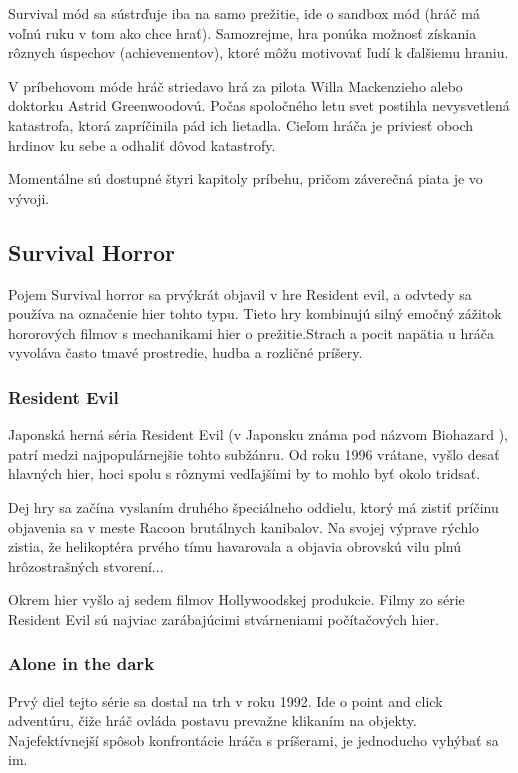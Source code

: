 \documentclass[10pt,oneoside,slovak,a4paper]{article}
\begin{document}
Survival mód sa  sústrďuje iba na samo prežitie, ide o sandbox  mód (hráč má voľnú ruku v tom ako chce hrať).  Samozrejme, hra ponúka  možnosť získania rôznych úspechov (achievementov), ktoré môžu motivovať ľudí k ďalšiemu hraniu. \cite{Virtanen}

V príbehovom móde hráč striedavo hrá za pilota Willa Mackenzieho  alebo doktorku  Astrid Greenwoodovú. Počas spoločného letu svet postihla nevysvetlená katastrofa, ktorá zapríčinila pád ich lietadla. Cieľom hráča je priviesť oboch hrdinov ku sebe a odhaliť dôvod katastrofy. \cite{Virtanen}

Momentálne sú dostupné štyri kapitoly príbehu, pričom záverečná piata je vo vývoji.


\subsection{Survival Horror}
Pojem Survival horror sa prvýkrát objavil v hre Resident evil, a odvtedy sa používa na označenie hier tohto typu. \cite{Kirkland} Tieto hry kombinujú silný emočný zážitok hororových filmov s mechanikami hier o prežitie.Strach a pocit napätia u hráča vyvoláva často  tmavé prostredie, hudba a rozličné príšery.

\subsubsection{Resident Evil}
Japonská herná séria Resident Evil (v Japonsku známa pod názvom Biohazard \cite{Capcom}), patrí medzi najpopulárnejšie tohto subžánru. Od roku 1996 vrátane, vyšlo desať hlavných hier, hoci spolu s rôznymi vedľajšími by to mohlo byť okolo tridsať.  \cite{ResEv}

Dej hry sa začína vyslaním druhého špeciálneho oddielu, ktorý má zistiť príčinu objavenia sa v meste Racoon brutálnych kanibalov. Na svojej výprave rýchlo zistia, že helikoptéra prvého tímu havarovala a objavia obrovskú vilu plnú hrôzostrašných stvorení...\cite{WindowsCentral}

Okrem hier vyšlo aj sedem filmov Hollywoodskej produkcie. Filmy zo série Resident Evil sú najviac zarábajúcimi stvárneniami počítačových hier. \cite{Ehli}


\subsubsection{Alone in the dark}
Prvý diel tejto série sa dostal na trh v roku 1992. Ide o point and click adventúru, čiže hráč ovláda postavu prevažne klikaním na objekty. Najefektívnejší spôsob konfrontácie hráča s príšerami, je jednoducho vyhýbať sa im.\cite{Reid}
\end{document}
